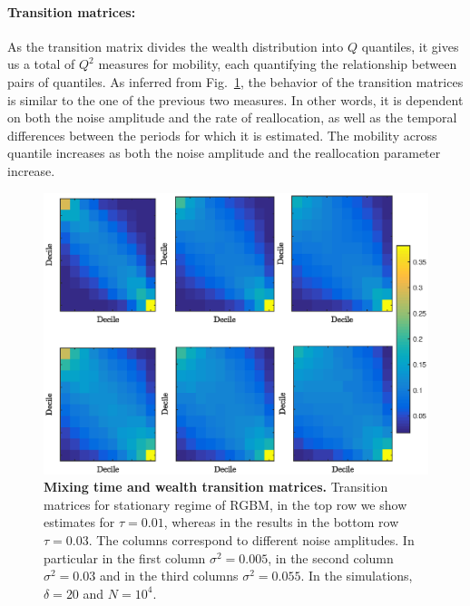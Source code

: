 \documentclass[11pt]{article}
\newcommand{\fref}[1]{Fig.~\ref{fig:#1}}
\numberwithin{equation}{section}
\begin{document}
\paragraph{Transition matrices:} 


As the transition matrix divides the wealth distribution into $Q$ quantiles, it gives us a total of $Q^2$ measures for mobility, each quantifying the relationship between pairs of quantiles. 
As inferred from \fref{rgbm-wealth-matrices}, the behavior of the transition matrices is similar to the one of the previous two measures. In other words, it is dependent on both the noise amplitude and the rate of reallocation, as well as the temporal differences between the periods for which it is estimated. The mobility across quantile increases as both the noise amplitude and the reallocation parameter increase.

\begin{figure}[!htb]
\centering
\includegraphics[width=1.0\textwidth]{figs/fig_rgbm_copulas.eps}
\caption{\textbf{Mixing time and wealth transition matrices.}  Transition matrices for stationary regime of RGBM, in the top row we show estimates for $\tau = 0.01$, whereas in the results in the bottom row $\tau = 0.03$. The columns correspond to different noise amplitudes. In particular in the first column $\sigma^2 = 0.005$, in the second column $\sigma^2 = 0.03$ and in the third columns $\sigma^2 = 0.055$. In the simulations, $\delta = 20$ and $N = 10^4$.
\label{fig:rgbm-wealth-matrices}}
\end{figure}
\FloatBarrier
\end{document}
